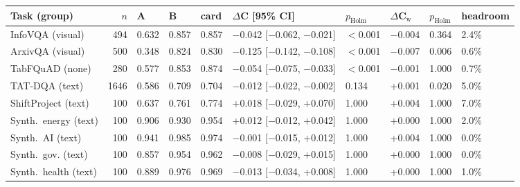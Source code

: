 \begin{adjustbox}{max width=\linewidth}
\begin{tabular}{lrllllllll}
\toprule
Task (group) & $n$ & A & B & card & $\Delta$C [95\% CI] & $p_\mathrm{Holm}$ & $\Delta$C$_\text{w}$ & $p_\mathrm{Holm}$ & headroom \\
\midrule
InfoVQA (visual) & 494 & 0.632 & 0.857 & 0.857 & $-$0.042 [$-$0.062, $-$0.021] & $<$0.001 & $-$0.004 & 0.364 & 2.4\% \\
ArxivQA (visual) & 500 & 0.348 & 0.824 & 0.830 & $-$0.125 [$-$0.142, $-$0.108] & $<$0.001 & $-$0.007 & 0.006 & 0.6\% \\
TabFQuAD (none) & 280 & 0.577 & 0.853 & 0.874 & $-$0.054 [$-$0.075, $-$0.033] & $<$0.001 & $-$0.001 & 1.000 & 0.7\% \\
TAT-DQA (text) & 1646 & 0.586 & 0.709 & 0.704 & $-$0.012 [$-$0.022, $-$0.002] & 0.134 & +0.001 & 0.020 & 5.0\% \\
ShiftProject (text) & 100 & 0.637 & 0.761 & 0.774 & +0.018 [$-$0.029, +0.070] & 1.000 & +0.004 & 1.000 & 7.0\% \\
Synth.\ energy (text) & 100 & 0.906 & 0.930 & 0.954 & +0.012 [$-$0.012, +0.042] & 1.000 & +0.000 & 1.000 & 2.0\% \\
Synth.\ AI (text) & 100 & 0.941 & 0.985 & 0.974 & $-$0.001 [$-$0.015, +0.012] & 1.000 & +0.004 & 1.000 & 0.0\% \\
Synth.\ gov. (text) & 100 & 0.857 & 0.954 & 0.962 & $-$0.008 [$-$0.029, +0.015] & 1.000 & +0.000 & 1.000 & 0.0\% \\
Synth.\ health (text) & 100 & 0.889 & 0.976 & 0.969 & $-$0.013 [$-$0.034, +0.008] & 1.000 & +0.000 & 1.000 & 1.0\% \\
\bottomrule
\end{tabular}
\end{adjustbox}
\par{}
